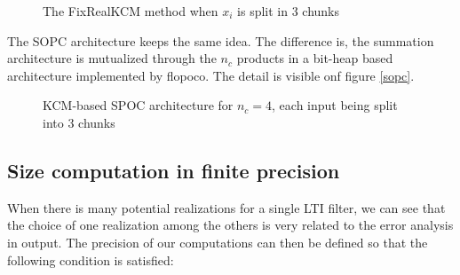 \begin{figure}[b]
\begin{center}
\end{center}
\caption{The FixRealKCM method when $x_i$ is split in 3 chunks   \label{fig:FixRealKCM}}
\end{figure}

	The SOPC architecture keeps the same idea.
	The difference is, the summation architecture is mutualized through the $n_c$ products in a bit-heap based architecture implemented by flopoco.
	The detail is visible onf figure \ref{sopc}.

\begin{figure}
  \begin{center}
\end{center}
\caption{KCM-based SPOC architecture for $n_c=4$, each input being split into 3 chunks  \label{fig:Overall architecture}}
\end{figure}
	

	\subsection{Size computation in finite precision}
	When there is many potential realizations for a single LTI filter, we can see that the choice of one realization
	among the others is very related to the error analysis in output.
	The precision of our computations can then be defined so that the following condition is satisfied:

